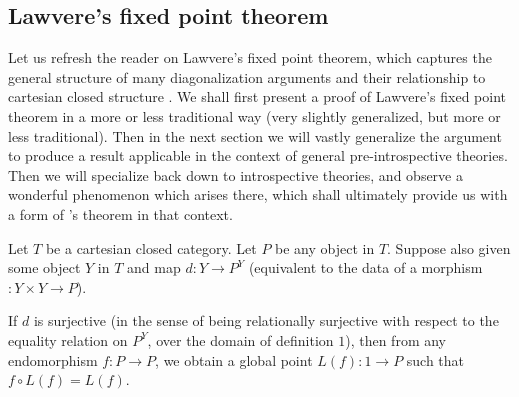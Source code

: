 \subsection{Lawvere's fixed point theorem}
Let us refresh the reader on Lawvere's fixed point theorem, which captures the general structure of many diagonalization arguments and their relationship to cartesian closed structure . We shall first present a proof of Lawvere's fixed point theorem in a more or less traditional way (very slightly generalized, but more or less traditional). Then in the next section we will vastly generalize the argument to produce a result applicable in the context of general pre-introspective theories. Then we will specialize back down to introspective theories, and observe a wonderful  phenomenon which arises there, which shall ultimately provide us with a form of \Loeb's theorem in that context.

\label{LawvereFPT}
Let $T$ be a cartesian closed category. Let $P$ be any object in $T$. Suppose also given some object $Y$ in $T$ and map $d : Y \to P^Y$ (equivalent to the data of a morphism $: Y \times Y \to P$).

If $d$ is surjective (in the sense of being relationally surjective with respect to the equality relation on $P^Y$, over the domain of definition $1$), then from any endomorphism $f: P \to P$, we obtain a global point $L(f) : 1 \to P$ such that $f \circ L(f) = L(f)$.


